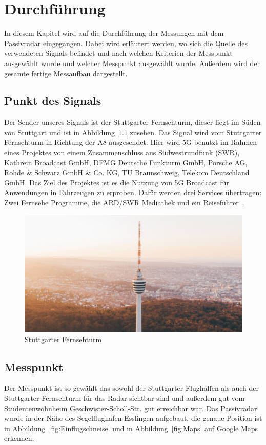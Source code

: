 \chapter{Durchführung}
In diesem Kapitel wird auf die Durchführung der Messungen mit dem Passivradar eingegangen. Dabei wird erläutert werden, wo sich die Quelle des verwendeten Signals befindet und nach welchen Kriterien der Messpunkt ausgewählt wurde und welcher Messpunkt ausgewählt wurde. Außerdem wird der gesamte fertige Messaufbau dargestellt.
\section{Punkt des Signals}
Der Sender unseres Signals ist der Stuttgarter Fernsehturm, dieser liegt im Süden von Stuttgart und ist in Abbildung~\ref{fig:Fernsehturm} zusehen. Das Signal wird vom Stuttgarter Fernsehturm in Richtung der A8 ausgesendet. Hier wird 5G benutzt im Rahmen eines Projektes von einem Zusammenschluss aus Südwestrundfunk (SWR), Kathrein Broadcast GmbH,  DFMG  Deutsche Funkturm GmbH, Porsche AG, Rohde \& Schwarz GmbH \& Co. KG, TU Braunschweig, Telekom Deutschland GmbH. Das Ziel des Projektes ist es die Nutzung von 5G Broadcast für Anwendungen in Fahrzeugen zu erproben. Dafür werden drei Services übertragen: Zwei Fernsehe Programme, die ARD/SWR Mediathek und ein Reiseführer~\cite{5GMAG2021}. 
\begin{figure}
    \centering
    \includegraphics[width=\textwidth]{images/Fernsehturm.jpg}
    \caption{Stuttgarter Fernsehturm}\label{fig:Fernsehturm}
\end{figure}

\section{Messpunkt}
Der Messpunkt ist so gewählt das sowohl der Stuttgarter Flughaffen als auch der Stuttgarter Fernsehturm für das Radar sichtbar sind und außerdem gut vom Studentenwohnheim Geschwister-Scholl-Str. gut erreichbar war. Das Passivradar wurde in der Nähe des Segelflughafen Esslingen aufgebaut, die genaue Position ist in Abbildung~\ref{fig:Einflugschneise} und in Abbildung~\ref{fig:Maps} auf Google Maps erkennen.

